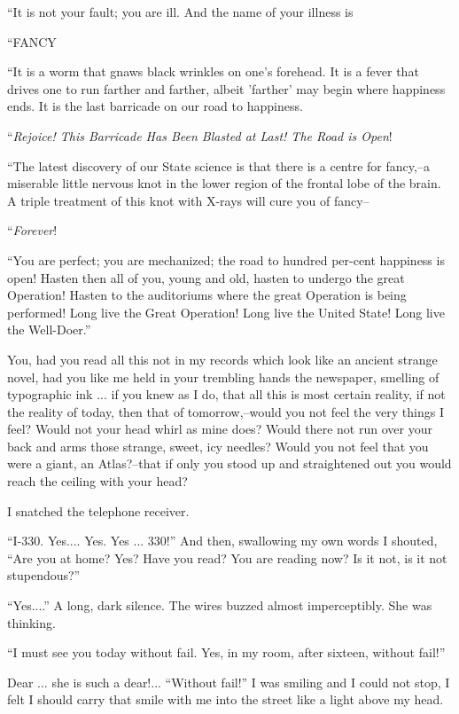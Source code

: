 \documentclass[11pt,openany]{book}
\begin{document}
``It is not your fault; you are ill. And the name of your illness is

``FANCY

``It is a worm that gnaws black wrinkles on one's forehead. It is a fever that drives one to run farther and farther, albeit 'farther' may begin where happiness ends. It is the last barricade on our road to happiness.

``\emph{Rejoice! This Barricade Has Been Blasted at Last! The Road is Open}!

``The latest discovery of our State science is that there is a centre for fancy,--a miserable little nervous knot in the lower region of the frontal lobe of the brain. A triple treatment of this knot with X-rays will cure you of fancy--

``\emph{Forever}!

``You are perfect; you are mechanized; the road to hundred per-cent happiness is open! Hasten then all of you, young and old, hasten to undergo the great Operation! Hasten to the auditoriums where the great Operation is being performed! Long live the Great Operation! Long live the United State! Long live the Well-Doer.''

You, had you read all this not in my records which look like an ancient strange novel, had you like me held in your trembling hands the newspaper, smelling of typographic ink ... if you knew as I do, that all this is most certain reality, if not the reality of today, then that of tomorrow,--would you not feel the very things I feel? Would not your head whirl as mine does? Would there not run over your back and arms those strange, sweet, icy needles? Would you not feel that you were a giant, an Atlas?--that if only you stood up and straightened out you would reach the ceiling with your head?

I snatched the telephone receiver.

``I-330. Yes.... Yes. Yes ... 330!'' And then, swallowing my own words I shouted, ``Are you at home? Yes? Have you read? You are reading now? Is it not, is it not stupendous?''

``Yes....'' A long, dark silence. The wires buzzed almost imperceptibly. She was thinking.

``I must see you today without fail. Yes, in my room, after sixteen, without fail!''

Dear ... she is such a dear!... ``Without fail!'' I was smiling and I could not stop, I felt I should carry that smile with me into the street like a light above my head.
\end{document}
